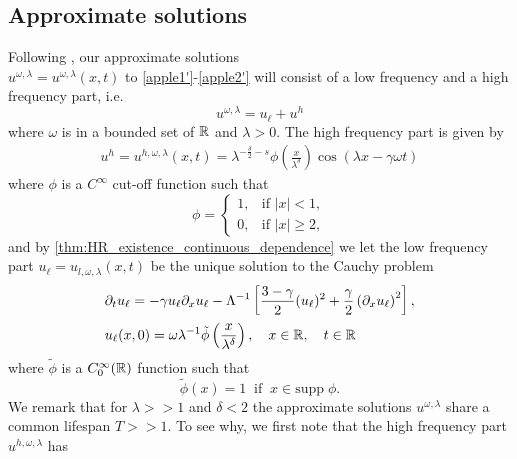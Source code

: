 \subsection{Approximate solutions}
Following \cite{Himonas:2009fk}, our approximate solutions
\\ $u^{\omega, \lambda} = u^{\omega,
\lambda}(x,t)$ to \eqref{apple1'}-\eqref{apple2'} will
consist of a low frequency and a high frequency part,
i.e.
%
%
%
%
\begin{equation}
\label{apple1}
u^{\omega,\lambda} = u_\ell + u^h
\end{equation}
%
%
%
%
where $\omega$ is in a bounded set of $\mathbb{R}$ and $\lambda > 0$. The high frequency part is given by 
%
%
%
%
\begin{equation}
\begin{split}
u^h = u^{h,\omega,\lambda}(x,t) =
\lambda^{-\frac{\delta}{2} -s}
\phi \left (\frac{x}{\lambda^\delta}\right )
\cos(\lambda x - \gamma \omega t)
\end{split}
\end{equation}
%
%
%
%
where $\phi$ is a $C^\infty$ cut-off function such that
%
%
%
%
\begin{equation*}
\phi = \begin{cases}
1, &\text{if $|x|<1$,} \\
0, &\text{if $|x| \ge 2,$} \end{cases}
\end{equation*}
%
%
%
%
and by \cref{thm:HR_existence_continuous_dependence} 
we let the low frequency part $u_\ell = u_{l,
\omega, \lambda}(x,t)$ be the unique solution to the Cauchy problem
%
%
\begin{align}
\label{u-l-apple1'}
& \partial_t u_\ell = -\gamma u_\ell \partial_x u_\ell -
\Lambda^{-1} \left[ \frac{3-\gamma}{2}(u_\ell)^2 +
\frac{\gamma}{2} \left( \partial_x u_\ell \right)^2
\right],
\\
& u_\ell(x,0) = \omega \lambda^{-1} \tilde{\phi} \left(
\frac{x}{\lambda^{\delta}}
\right), \quad x \in \mathbb{R}, \quad t \in \mathbb{R}
\label{apple1ah}
\end{align}
%
%
%
%
where $\tilde{\phi}$ is a $C^{\infty}_0(\mathbb{R})$ function such that
%
%
%
%
\begin{equation}
\label{apple1ah7}
\tilde{\phi}(x) = 1 \; \;  \text{if} \; \;
x \in \text{supp} \; \phi.
\end{equation}
%
%
%
%
We remark that for $\lambda >>1$ and $\delta < 2$ the approximate solutions 
$u^{\omega, \lambda}$ share a common lifespan $T >> 1$. To see why, we 
first note that the high frequency part $u^{h, \omega, \lambda}$ has 
